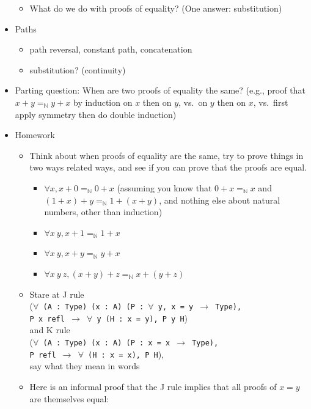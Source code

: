 \documentclass{article}
\begin{document}
\begin{itemize}
\begin{itemize}
      \item What do we do with proofs of equality?  (One answer: substitution)
    \end{itemize}
  \item
    Paths
    \begin{itemize}
      \item path reversal, constant path, concatenation
      \item substitution? (continuity)
    \end{itemize}
  \item Parting question: When are two proofs of equality the same? (e.g., proof that $x + y =_{\mathbb{N}} y + x$ by induction on $x$ then on $y$, vs.~on $y$ then on $x$, vs.~first apply symmetry then do double induction)
  \item Homework
    \begin{itemize}
      \item Think about when proofs of equality are the same, try to prove things in two ways related ways, and see if you can prove that the proofs are equal.
      \begin{itemize}
        \item $\forall x, x + 0 =_{\mathbb{N}} 0 + x$ (assuming you know that $0 + x =_{\mathbb{N}} x$ and $(1 + x) + y =_{\mathbb{N}} 1 + (x + y)$, and nothing else about natural numbers, other than induction)
        \item $\forall x\ y, x + 1 =_{\mathbb{N}} 1 + x$
        \item $\forall x\ y, x + y =_{\mathbb{N}} y + x$
        \item $\forall x\ y\ z, (x + y) + z =_{\mathbb{N}} x + (y + z)$
      \end{itemize}
      \item Stare at J rule \\
        (\texttt{$\forall$~(A~:~Type) (x~:~A) (P~:~$\forall$ y, x = y $\to$ Type), \\ P x refl $\to$ $\forall$~y (H~:~x = y), P y H}) \\
        and K rule \\
        (\texttt{$\forall$~(A~:~Type) (x~:~A) (P~:~x = x $\to$ Type), \\ P refl $\to$ $\forall$~(H~:~x~=~x), P H}), \\
        say what they mean in words
      \item
        Here is an informal proof that the J rule implies that all proofs of $x = y$ are themselves equal: \\

\end{itemize}
\end{itemize}
\end{document}

